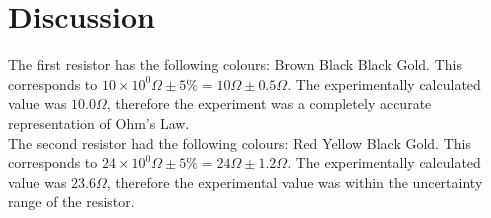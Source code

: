 \documentclass[
	letterpaper, %
	12pt, %
]{CSUniSchoolLabReport}
\begin{document}
\section{Discussion}
The first resistor has the following colours: Brown Black Black Gold. This corresponds to $10\times 10^0\Omega \pm 5\% = 10\Omega\pm0.5\Omega$. The experimentally calculated value was $10.0\Omega$, therefore the experiment was a completely accurate representation of Ohm's Law.\\

The second resistor had the following colours: Red Yellow Black Gold. This corresponds to $24\times10^0 \Omega \pm 5\% = 24\Omega\pm 1.2\Omega$. The experimentally calculated value was $23.6\Omega$, therefore the experimental value was within the uncertainty range of the resistor.\\
\end{document}
